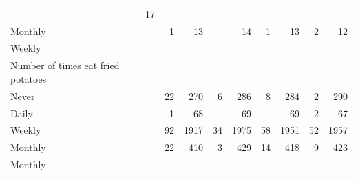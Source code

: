 \documentclass{article}
\begin{document}
\begin{table}[!h]
{\begin{tabular}{lllllllll}
			\multicolumn{1}{r}{17} \\
			\multicolumn{1}{l}{\hspace{5em}Monthly} &
			\multicolumn{1}{|r}{1} &
			\multicolumn{1}{r}{13} &
			\multicolumn{1}{r}{} &
			\multicolumn{1}{r}{14} &
			\multicolumn{1}{r}{1} &
			\multicolumn{1}{r}{13} &
			\multicolumn{1}{r}{2} &
			\multicolumn{1}{r}{12} \\
			\multicolumn{1}{l}{\hspace{3em}Weekly} &
			\multicolumn{1}{|r}{} &
			\multicolumn{1}{r}{} &
			\multicolumn{1}{r}{} &
			\multicolumn{1}{r}{} &
			\multicolumn{1}{r}{} &
			\multicolumn{1}{r}{} &
			\multicolumn{1}{r}{} &
			\multicolumn{1}{r}{} \\
			\multicolumn{1}{l}{\hspace{4em}Number of times eat fried potatoes} &
			\multicolumn{1}{|r}{} &
			\multicolumn{1}{r}{} &
			\multicolumn{1}{r}{} &
			\multicolumn{1}{r}{} &
			\multicolumn{1}{r}{} &
			\multicolumn{1}{r}{} &
			\multicolumn{1}{r}{} &
			\multicolumn{1}{r}{} \\
			\multicolumn{1}{l}{\hspace{5em}Never} &
			\multicolumn{1}{|r}{22} &
			\multicolumn{1}{r}{270} &
			\multicolumn{1}{r}{6} &
			\multicolumn{1}{r}{286} &
			\multicolumn{1}{r}{8} &
			\multicolumn{1}{r}{284} &
			\multicolumn{1}{r}{2} &
			\multicolumn{1}{r}{290} \\
			\multicolumn{1}{l}{\hspace{5em}Daily} &
			\multicolumn{1}{|r}{1} &
			\multicolumn{1}{r}{68} &
			\multicolumn{1}{r}{} &
			\multicolumn{1}{r}{69} &
			\multicolumn{1}{r}{} &
			\multicolumn{1}{r}{69} &
			\multicolumn{1}{r}{2} &
			\multicolumn{1}{r}{67} \\
			\multicolumn{1}{l}{\hspace{5em}Weekly} &
			\multicolumn{1}{|r}{92} &
			\multicolumn{1}{r}{1917} &
			\multicolumn{1}{r}{34} &
			\multicolumn{1}{r}{1975} &
			\multicolumn{1}{r}{58} &
			\multicolumn{1}{r}{1951} &
			\multicolumn{1}{r}{52} &
			\multicolumn{1}{r}{1957} \\
			\multicolumn{1}{l}{\hspace{5em}Monthly} &
			\multicolumn{1}{|r}{22} &
			\multicolumn{1}{r}{410} &
			\multicolumn{1}{r}{3} &
			\multicolumn{1}{r}{429} &
			\multicolumn{1}{r}{14} &
			\multicolumn{1}{r}{418} &
			\multicolumn{1}{r}{9} &
			\multicolumn{1}{r}{423} \\
			\multicolumn{1}{l}{\hspace{3em}Monthly} &

\end{tabular}}
\end{table}
\end{document}
